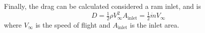 Finally, the drag can be calculated considered a ram inlet, and is
\begin{equation}
    D = \tfrac{1}{2}\rho V_\infty^2A_\text{inlet} = \tfrac{1}{2} \dot{m}V_\infty
\end{equation}
where $V_\infty$ is the speed of flight and $A_\text{inlet}$ is the inlet area.

%
